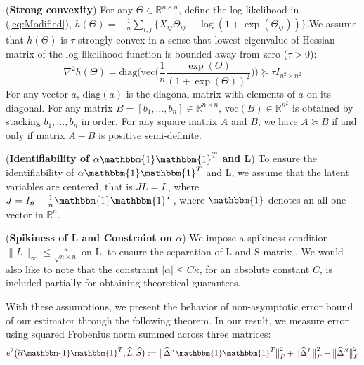 \documentclass[AMS,STIX1COL]{WileyNJD-v2}
\begin{document}
{\begin{assumption}(\textbf{Strong convexity})  \label{Ass:1}
For any $\Theta \in \mathbb{R}^{n\times n}$, define the log-likelihood in (\ref{eq:Modified}), $h(\Theta) = -\frac{1}{n}\sum_{i,j} \big\{ X_{ij}\Theta_{ij} - \log(1+\exp(\Theta_{ij})) \big\}$.We assume that $h(\Theta)$ is $\tau$-strongly convex in a sense that lowest eigenvalue of Hessian matrix of the log-likelihood function is bounded away from zero ($\tau > 0$):
\[
\nabla^{2}h(\Theta) = \mbox{diag}\Big(\mbox{vec}\Big(\frac{1}{n}\frac{\exp(\Theta)}{(1+\exp(\Theta))^{2}}
\Big)\Big) \succcurlyeq \tau I_{n^{2} \times n^{2}}
\]
For any vector $a$, $\mbox{diag}(a)$ is the diagonal matrix with elements of $a$ on its diagonal.
For any matrix $B=[b_1,\dots,b_n]\in\mathbb{R}^{n \times n}$, $\mbox{vec}(B)\in\mathbb{R}^{n^2}$ is obtained by stacking $ b_1,\dots, b_{n}$ in order.
For any square matrix $A$ and $B$, we have $ A \succcurlyeq B $ if and only if matrix $A-B$ is positive semi-definite.
\end{assumption}

\begin{assumption} (\textbf{Identifiability of $\alpha\mathbbm{1}\mathbbm{1}^T$ and L}) \label{Ass:2}
To ensure the identifiability of $\alpha\mathbbm{1}\mathbbm{1}^T$ and L, we assume that the latent variables are centered, that is $JL=L$, where $J=I_{n}-\frac{1}{n}\mathbbm{1}\mathbbm{1}^T$, where $\mathbbm{1}$ denotes an all one vector in $\mathbb{R}^{n}$.
\end{assumption}

\begin{assumption} (\textbf{Spikiness of L and Constraint on $\alpha$}) \label{Ass:3}
We impose a spikiness condition $\|L\|_{\infty}\leq\frac{\kappa}{\sqrt{n \times n}}$ on L, to ensure the separation of L and S matrix \cite{agarwal2012noisy}. We would also like to note that the constraint $|\alpha|\leq C\kappa$, for an absolute constant $C$, is included partially for obtaining theoretical guarantees.
\end{assumption}

With these assumptions, we present the behavior of non-asymptotic error bound of our estimator through the following theorem. In our result, we measure error using squared Frobenius norm summed across three matrices:
\[
    e^{2}\big(\widehat{\alpha}\mathbbm{1}\mathbbm{1}^T,\widehat{L},\widehat{S}\big)
    :=\big\|\widehat{\Delta}^{\alpha}\mathbbm{1}\mathbbm{1}^T\big\|_{F}^{2} + \big\|\widehat{\Delta}^{L}\big\|_{F}^{2} + \big\|\widehat{\Delta}^{S}\big\|_{F}^{2}
\]

}
\end{document}
